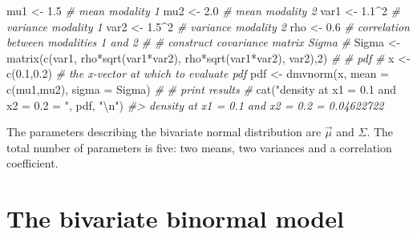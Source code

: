 \documentclass[
]{book}
\newenvironment{Shaded}{\begin{snugshade}}{\end{snugshade}}
\newcommand{\AttributeTok}[1]{\textcolor[rgb]{0.77,0.63,0.00}{#1}}
\newcommand{\CommentTok}[1]{\textcolor[rgb]{0.56,0.35,0.01}{\textit{#1}}}
\newcommand{\DecValTok}[1]{\textcolor[rgb]{0.00,0.00,0.81}{#1}}
\newcommand{\FloatTok}[1]{\textcolor[rgb]{0.00,0.00,0.81}{#1}}
\newcommand{\FunctionTok}[1]{\textcolor[rgb]{0.00,0.00,0.00}{#1}}
\newcommand{\NormalTok}[1]{#1}
\newcommand{\OtherTok}[1]{\textcolor[rgb]{0.56,0.35,0.01}{#1}}
\newcommand{\SpecialCharTok}[1]{\textcolor[rgb]{0.00,0.00,0.00}{#1}}
\newcommand{\StringTok}[1]{\textcolor[rgb]{0.31,0.60,0.02}{#1}}
\begin{document}
\begin{Shaded}
\begin{Highlighting}[numbers=left,,]
\NormalTok{mu1 }\OtherTok{\textless{}{-}} \FloatTok{1.5} \CommentTok{\# mean modality 1}
\NormalTok{mu2 }\OtherTok{\textless{}{-}} \FloatTok{2.0} \CommentTok{\# mean modality 2}
\NormalTok{var1 }\OtherTok{\textless{}{-}} \FloatTok{1.1}\SpecialCharTok{\^{}}\DecValTok{2}  \CommentTok{\# variance modality 1}
\NormalTok{var2 }\OtherTok{\textless{}{-}} \FloatTok{1.5}\SpecialCharTok{\^{}}\DecValTok{2} \CommentTok{\# variance modality 2}
\NormalTok{rho }\OtherTok{\textless{}{-}} \FloatTok{0.6} \CommentTok{\# correlation between modalities 1 and 2}
\CommentTok{\#}
\CommentTok{\# construct covariance matrix Sigma}
\CommentTok{\# }
\NormalTok{Sigma }\OtherTok{\textless{}{-}} \FunctionTok{matrix}\NormalTok{(}\FunctionTok{c}\NormalTok{(var1, rho}\SpecialCharTok{*}\FunctionTok{sqrt}\NormalTok{(var1}\SpecialCharTok{*}\NormalTok{var2), }
\NormalTok{                  rho}\SpecialCharTok{*}\FunctionTok{sqrt}\NormalTok{(var1}\SpecialCharTok{*}\NormalTok{var2), var2),}\DecValTok{2}\NormalTok{)}
\CommentTok{\#}
\CommentTok{\# pdf }
\CommentTok{\# }
\NormalTok{x }\OtherTok{\textless{}{-}} \FunctionTok{c}\NormalTok{(}\FloatTok{0.1}\NormalTok{,}\FloatTok{0.2}\NormalTok{) }\CommentTok{\# the x{-}vector at which to evaluate pdf}
\NormalTok{pdf  }\OtherTok{\textless{}{-}} \FunctionTok{dmvnorm}\NormalTok{(x, }\AttributeTok{mean =} \FunctionTok{c}\NormalTok{(mu1,mu2), }\AttributeTok{sigma =}\NormalTok{ Sigma)}
\CommentTok{\#}
\CommentTok{\# print results}
\CommentTok{\# }
\FunctionTok{cat}\NormalTok{(}\StringTok{"density at x1 = 0.1 and x2 = 0.2 = "}\NormalTok{, pdf, }\StringTok{"}\SpecialCharTok{\textbackslash{}n}\StringTok{"}\NormalTok{)}
\CommentTok{\#\textgreater{} density at x1 = 0.1 and x2 = 0.2 =  0.04622722}
\end{Highlighting}
\end{Shaded}

The parameters describing the bivariate normal distribution are \(\overrightarrow{\mu}\) and \(\Sigma\). The total number of parameters is five: two means, two variances and a correlation coefficient.

\hypertarget{bivariate-binormal-model-formulae}{%
\section{The bivariate binormal model}\label{bivariate-binormal-model-formulae}}
\end{document}
